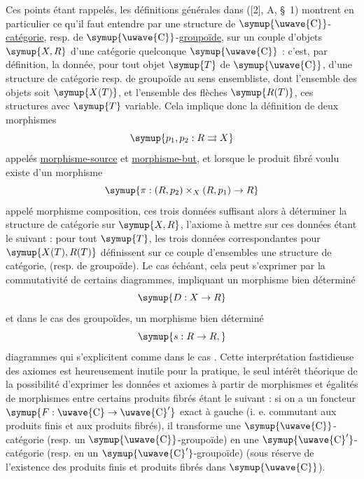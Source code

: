 Ces points étant rappelés, les définitions générales dans ([2], A,
\S~1) montrent en particulier ce qu'il faut entendre par une structure de
$\symup{\text{\uwave{C}}}$-\uline{catégorie}, resp. de $\symup{\text{\uwave{C}}}$-\uline{groupoïde}, sur un
couple d'objets $\symup{X,R}$ d'une catégorie quelconque $\symup{\text{\uwave{C}}}$ : c'est, par
définition, la donnée, pour tout objet $\symup{T}$ de $\symup{\text{\uwave{C}}}$, d'une structure
de catégorie resp. de groupoïde au sens ensembliste, dont l'ensemble des
objets soit $\symup{X(T)}$, et l'ensemble des flèches $\symup{R(T)}$, ces structures
 avec $\symup{T}$ variable.
Cela implique donc la définition de deux morphismes
\[
  \symup{p_1,p_2:R\rightrightarrows X}
\]
appelés \uline{morphisme-source} et \uline{morphisme-but}, et lorsque le produit
fibré voulu existe d'un morphisme
\[
  \symup{\pi:(R,p_2)\times_X(R,p_1)\to R}
\]
appelé morphisme composition, ces trois données suffisant alors à
déterminer la structure de catégorie sur $\symup{X,R}$, l'axiome à mettre sur ces
données étant le suivant : pour tout $\symup{T}$, les trois données correspondantes
pour $\symup{X(T),R(T)}$ définissent sur ce couple d'ensembles une structure de
catégorie, (resp. de groupoïde). Le cas échéant, cela peut s'exprimer par la
commutativité de certains diagrammes, impliquant un morphisme bien déterminé
\[
  \symup{D:X\to R}
\]
et dans le cas des groupoïdes, un morphisme bien déterminé
\[
  \symup{s:R\to R,}
\]
diagrammes qui s'explicitent comme dans le cas . Cette
interprétation fastidieuse des axiomes est heureusement inutile pour la
pratique, le seul intérêt théorique de la possibilité d'exprimer les données
et axiomes à partir de morphismes et égalités de morphismes entre certains
produits fibrés étant le suivant : si on a un foncteur
$\symup{F:\text{\uwave{C}}\to\text{\uwave{C}}'}$ exact à gauche (i. e. commutant aux produits
finis et aux produits fibrés), il transforme une $\symup{\text{\uwave{C}}}$-catégorie
(resp. un $\symup{\text{\uwave{C}}}$-groupoïde) en une $\symup{\text{\uwave{C}}'}$-catégorie (resp. en un
$\symup{\text{\uwave{C}}'}$-groupoïde) (sous réserve de l'existence des produits finis et
produits fibrés dans $\symup{\text{\uwave{C}}}$).


